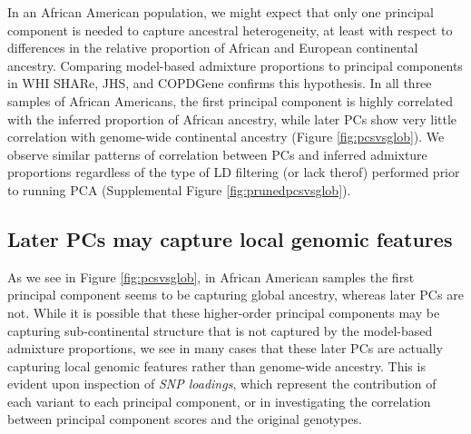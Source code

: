 \documentclass[12pt]{article}
\begin{document}
In an African American population, we might expect that only one principal component is needed to capture ancestral heterogeneity, at least with respect to differences in the relative proportion of African and European continental ancestry. 
Comparing model-based admixture proportions to principal components in WHI SHARe, JHS, and COPDGene confirms this hypothesis. 
In all three samples of African Americans, the first principal component is highly correlated with the inferred proportion of African ancestry, while later PCs show very little correlation with genome-wide continental ancestry (Figure \ref{fig:pcsvsglob}).
We observe similar patterns of correlation between PCs and inferred admixture proportions regardless of the type of LD filtering (or lack therof) performed prior to running PCA (Supplemental Figure \ref{fig:prunedpcsvsglob}). 


\subsection{Later PCs may capture local genomic features}
\label{sec:CorrPlots}

%
%


As we see in Figure \ref{fig:pcsvsglob}, in African American samples the first principal component seems to be capturing global ancestry, whereas later PCs are not.
While it is possible that these higher-order principal components may be capturing sub-continental structure that is not captured by the model-based admixture proportions, we see in many cases that these later PCs are actually capturing local genomic features rather than genome-wide ancestry. 
This is evident upon inspection of \textit{SNP loadings}, which represent the contribution of each variant to each principal component, or in investigating the correlation between principal component scores and the original genotypes.
\end{document}
